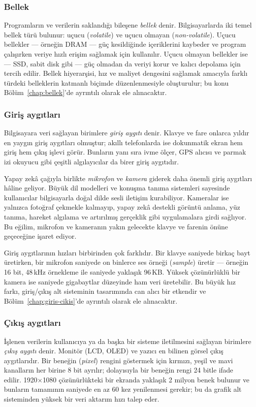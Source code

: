 \subsubsection*{Bellek}
Programların ve verilerin saklandığı bileşene \emph{bellek} denir. Bilgisayarlarda iki temel bellek türü bulunur: uçucu (\emph{volatile}) ve uçucu olmayan (\emph{non-volatile}). Uçucu bellekler --- örneğin DRAM --- güç kesildiğinde içeriklerini kaybeder ve program çalışırken veriye hızlı erişim sağlamak için kullanılır. Uçucu olmayan bellekler ise --- SSD, sabit disk gibi --- güç olmadan da veriyi korur ve kalıcı depolama için tercih edilir. Bellek hiyerarşisi, hız ve maliyet dengesini sağlamak amacıyla farklı türdeki belleklerin katmanlı biçimde düzenlenmesiyle oluşturulur; bu konu Bölüm~\ref{chap:bellek}'de ayrıntılı olarak ele alınacaktır.

\subsubsection*{Giriş aygıtları}
Bilgisayara veri sağlayan birimlere \emph{giriş aygıtı} denir. Klavye ve fare onlarca yıldır en yaygın giriş aygıtları olmuştur; akıllı telefonlarda ise dokunmatik ekran hem giriş hem çıkış işlevi görür. Bunların yanı sıra ivme ölçer, GPS alıcısı ve parmak izi okuyucu gibi çeşitli algılayıcılar da birer giriş aygıtıdır.

Yapay zekâ çağıyla birlikte \emph{mikrofon} ve \emph{kamera} giderek daha önemli giriş aygıtları hâline geliyor. Büyük dil modelleri ve konuşma tanıma sistemleri sayesinde kullanıcılar bilgisayarla doğal dilde sesli iletişim kurabiliyor. Kameralar ise yalnızca fotoğraf çekmekle kalmayıp, yapay zekâ destekli görüntü anlama, yüz tanıma, hareket algılama ve artırılmış gerçeklik gibi uygulamalara girdi sağlıyor. Bu eğilim, mikrofon ve kameranın yakın gelecekte klavye ve farenin önüne geçeceğine işaret ediyor.

Giriş aygıtlarının hızları birbirinden çok farklıdır. Bir klavye saniyede birkaç bayt üretirken, bir mikrofon saniyede on binlerce ses örneği (\emph{sample}) üretir --- örneğin 16 bit, 48\,kHz örnekleme ile saniyede yaklaşık 96\,KB. Yüksek çözünürlüklü bir kamera ise saniyede gigabaytlar düzeyinde ham veri üretebilir. Bu büyük hız farkı, giriş/çıkış alt sisteminin tasarımında can alıcı bir etkendir ve Bölüm~\ref{chap:giris-cikis}'de ayrıntılı olarak ele alınacaktır.

\subsubsection*{Çıkış aygıtları}
İşlenen verilerin kullanıcıya ya da başka bir sisteme iletilmesini sağlayan birimlere \emph{çıkış aygıtı} denir. Monitör (LCD, OLED) ve yazıcı en bilinen görsel çıkış aygıtlarıdır. Bir beneğin (\emph{pixel}) rengini göstermek için kırmızı, yeşil ve mavi kanalların her birine 8 bit ayrılır; dolayısıyla bir beneğin rengi 24 bitle ifade edilir. 1920$\times$1080 çözünürlükteki bir ekranda yaklaşık 2 milyon benek bulunur ve bunların tamamının saniyede en az 60 kez yenilenmesi gerekir; bu da grafik alt sisteminden yüksek bir veri aktarım hızı talep eder.

